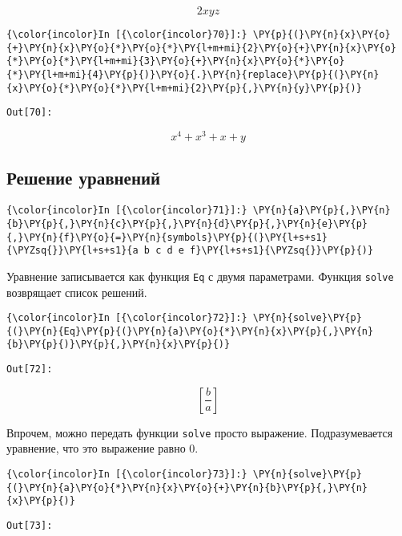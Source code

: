     \[2 x y z\]

    

    \begin{Verbatim}[commandchars=\\\{\}]
{\color{incolor}In [{\color{incolor}70}]:} \PY{p}{(}\PY{n}{x}\PY{o}{+}\PY{n}{x}\PY{o}{*}\PY{o}{*}\PY{l+m+mi}{2}\PY{o}{+}\PY{n}{x}\PY{o}{*}\PY{o}{*}\PY{l+m+mi}{3}\PY{o}{+}\PY{n}{x}\PY{o}{*}\PY{o}{*}\PY{l+m+mi}{4}\PY{p}{)}\PY{o}{.}\PY{n}{replace}\PY{p}{(}\PY{n}{x}\PY{o}{*}\PY{o}{*}\PY{l+m+mi}{2}\PY{p}{,}\PY{n}{y}\PY{p}{)}
\end{Verbatim}
\texttt{\color{outcolor}Out[{\color{outcolor}70}]:}
    
    \[x^{4} + x^{3} + x + y\]

    

\subsection{Решение уравнений}
\label{sympy05}

    \begin{Verbatim}[commandchars=\\\{\}]
{\color{incolor}In [{\color{incolor}71}]:} \PY{n}{a}\PY{p}{,}\PY{n}{b}\PY{p}{,}\PY{n}{c}\PY{p}{,}\PY{n}{d}\PY{p}{,}\PY{n}{e}\PY{p}{,}\PY{n}{f}\PY{o}{=}\PY{n}{symbols}\PY{p}{(}\PY{l+s+s1}{\PYZsq{}}\PY{l+s+s1}{a b c d e f}\PY{l+s+s1}{\PYZsq{}}\PY{p}{)}
\end{Verbatim}

    Уравнение записывается как функция \texttt{Eq} с двумя параметрами.
Функция \texttt{solve} возврящает список решений.

    \begin{Verbatim}[commandchars=\\\{\}]
{\color{incolor}In [{\color{incolor}72}]:} \PY{n}{solve}\PY{p}{(}\PY{n}{Eq}\PY{p}{(}\PY{n}{a}\PY{o}{*}\PY{n}{x}\PY{p}{,}\PY{n}{b}\PY{p}{)}\PY{p}{,}\PY{n}{x}\PY{p}{)}
\end{Verbatim}
\texttt{\color{outcolor}Out[{\color{outcolor}72}]:}
    
    \[\left [ \frac{b}{a}\right ]\]

    

    Впрочем, можно передать функции \texttt{solve} просто выражение.
Подразумевается уравнение, что это выражение равно 0.

    \begin{Verbatim}[commandchars=\\\{\}]
{\color{incolor}In [{\color{incolor}73}]:} \PY{n}{solve}\PY{p}{(}\PY{n}{a}\PY{o}{*}\PY{n}{x}\PY{o}{+}\PY{n}{b}\PY{p}{,}\PY{n}{x}\PY{p}{)}
\end{Verbatim}
\texttt{\color{outcolor}Out[{\color{outcolor}73}]:}
    
